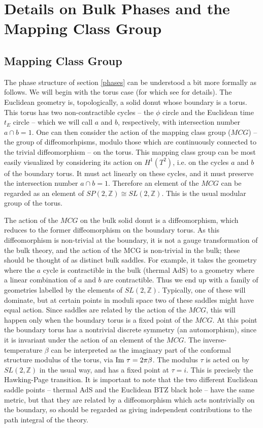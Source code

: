 \documentclass[12pt]{article}
\newcommand{\ZZ}{\mathbb{Z}} %
\numberwithin{equation}{section}
\begin{document}
\section{Details on Bulk Phases and the Mapping Class Group}
\label{bulkdetails}
\subsection{Mapping Class Group}
 \label{mcg}

The phase structure of section \ref{phases}  can be understood a bit more formally as follows.  We will begin with the torus case  (for which see \cite{Maloney:2007ud, Maldacena:1998bw, Dijkgraaf:2000fq} for details).  The Euclidean geometry is, topologically, a solid donut whose boundary is a torus. This torus has two non-contractible cycles -- the $\phi$ circle and the Euclidean time $t_E$ circle -- which we will call $a$ and $b$, respectively, with intersection number $a \cap b=1$.
One can then consider the action of the mapping class group ($MCG$) -- the group of diffeomorhpisms, modulo those which are continuously connected to the trivial diffeomorphism -- on the torus. This mapping class group can be most easily visualized by considering its action on $H^1(T^2)$, i.e. on the cycles $a$ and $b$ of the boundary torus. It must act linearly on these cycles, and it must preserve the intersection number $a \cap b=1$.  Therefore an element of the $MCG$ can be regarded as an element of $SP(2,\ZZ)\cong SL(2,\ZZ)$.  This is the usual modular  group of the torus.

The action of the $MCG$ on the bulk solid donut is a diffeomorphism, which reduces to the former diffeomorphism on the boundary torus. As this diffeomorphism is non-trivial at the boundary, it is not a gauge transformation of the bulk theory, and the action of the MCG is non-trivial in the bulk; these should be thought of as distinct bulk saddles.  For example, it takes the geometry where the $a$ cycle is contractible in the bulk (thermal AdS) to a geometry where a linear combination of $a$ and $b$ are contractible. Thus we end up with a family of geometries labelled by the elements of $SL(2,\ZZ)$. Typically, one of these will dominate, but at certain points in moduli space two of these saddles might have equal action.  Since saddles are related by the action of the $MCG$, this will  happen only when the boundary torus is a fixed point of the $MCG$.  At this point the boundary torus has a nontrivial discrete symmetry (an automorphism), since it is invariant under the action of an element of the $MCG$. The inverse-temperature $\beta$ can be interpreted as the imaginary part of the conformal structure modulus of the torus, via ${\rm Im}~\tau = 2 \pi \beta$.  The modulus $\tau$ is acted on by $SL(2,\ZZ)$ in the usual way, and has a fixed point at $\tau=i$. This is precisely the Hawking-Page transition.  It is important to note that the two different Euclidean saddle points -- thermal AdS and the Euclidean BTZ black hole --  have the same metric, but that they are related by a diffeomorphism which acts nontrivially on the boundary, so should be regarded as giving independent contributions to the path integral of the theory.
\end{document}
